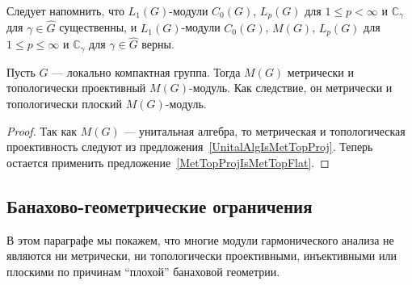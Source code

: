 Следует напомнить, что $L_1(G)$-модули $C_0(G)$, $L_p(G)$ для $1\leq p<\infty$ и
$\mathbb{C}_\gamma$ для $\gamma\in\widehat{G}$ существенны, и $L_1(G)$-модули
$C_0(G)$, $M(G)$, $L_p(G)$ для $1\leq p\leq \infty$ и $\mathbb{C}_\gamma$ для
$\gamma\in\widehat{G}$ верны. 

\begin{proposition}\label{MGModMGMetTopProjFlatCharac} Пусть $G$ --- локально
компактная группа. Тогда $M(G)$ метрически и топологически проективный
$M(G)$-модуль. Как следствие, он метрически и топологически плоский
$M(G)$-модуль.
\end{proposition} 
\begin{proof} Так как $M(G)$ --- унитальная алгебра, то метрическая и
топологическая проективность следуют из предложения~\ref{UnitalAlgIsMetTopProj}.
Теперь остается применить предложение~\ref{MetTopProjIsMetTopFlat}.
\end{proof}


\subsection{Банахово-геометрические 
    ограничения}\label{SubSectionBanachGeometricRestriction}

В этом параграфе мы покажем, что многие модули гармонического анализа не
являются ни метрически, ни топологически проективными, инъективными или плоскими
по причинам ``плохой'' банаховой геометрии. 

